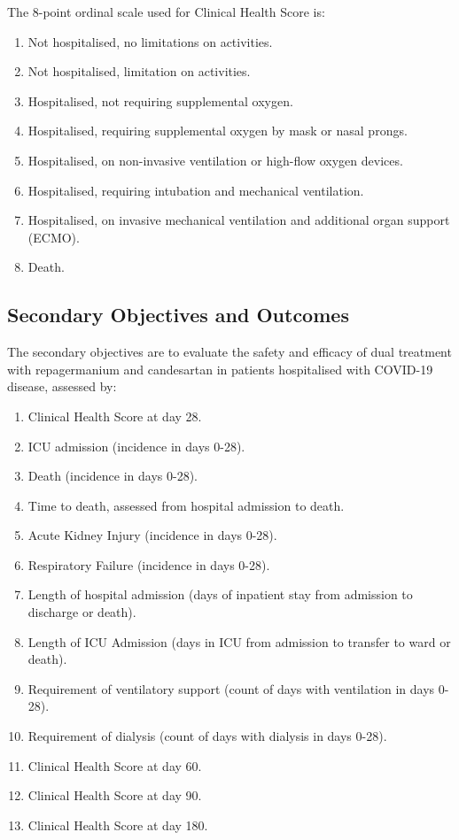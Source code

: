 \documentclass[11pt,parskip=half-]{scrartcl}
\begin{document}
The 8-point ordinal scale used for Clinical Health Score is:
\begin{enumerate}[nolistsep]
    \item Not hospitalised, no limitations on activities.
    \item Not hospitalised, limitation on activities.
    \item Hospitalised, not requiring supplemental oxygen.
    \item Hospitalised, requiring supplemental oxygen by mask or nasal prongs.
    \item  Hospitalised, on non-invasive ventilation or high-flow oxygen devices.
    \item Hospitalised, requiring intubation and mechanical ventilation.
    \item Hospitalised, on invasive mechanical ventilation and additional organ support (ECMO).
    \item Death.
\end{enumerate}

\subsection{Secondary Objectives and Outcomes}
The secondary objectives are to evaluate the safety and efficacy of dual treatment with repagermanium and candesartan in patients hospitalised with COVID-19 disease, assessed by:
\begin{enumerate}
    \item Clinical Health Score at day 28.
    \item ICU admission (incidence in days 0-28).
    \item Death (incidence in days 0-28).
    \item Time to death, assessed from hospital admission to death.
    \item Acute Kidney Injury (incidence in days 0-28).
    \item Respiratory Failure (incidence in days 0-28).
    \item Length of hospital admission (days of inpatient stay from admission to discharge or death).
    \item Length of ICU Admission (days in ICU from admission to transfer to ward or death).
    \item Requirement of ventilatory support (count of days with ventilation in days 0-28).
    \item Requirement of dialysis (count of days with dialysis in days 0-28).
    \item Clinical Health Score at day 60.
    \item Clinical Health Score at day 90.
    \item Clinical Health Score at day 180.
\end{enumerate}
\end{document}

